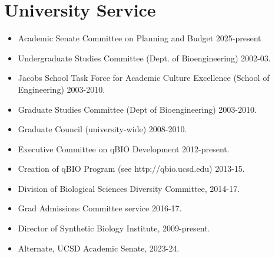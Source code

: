 \documentclass[11pt,a4paper,sans]{moderncv}        %
\begin{document}
\section{University Service}
\begin{itemize}
\item Academic Senate Committee on Planning and Budget 2025-present
\item Undergraduate Studies Committee (Dept. of Bioengineering) 2002-03.
\item Jacobs School Task Force for Academic Culture Excellence (School of Engineering) 2003-2010.
\item Graduate Studies Committee (Dept of Bioengineering) 2003-2010.
\item Graduate Council (university-wide) 2008-2010.
\item Executive Committee on qBIO Development  2012-present.
\item Creation of qBIO Program (see http://qbio.ucsd.edu) 2013-15.
\item Division of Biological Sciences Diversity Committee, 2014-17.
\item Grad Admissions Committee service 2016-17.
\item Director of Synthetic Biology Institute, 2009-present.
\item Alternate, UCSD Academic Senate, 2023-24. 
\end{itemize}
%
%
%
%
%
\end{document}
